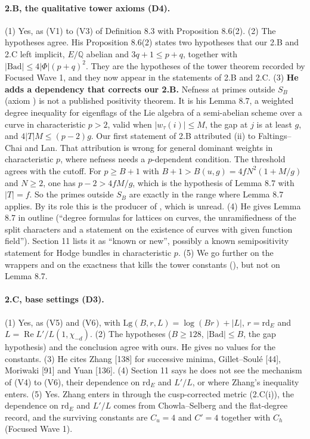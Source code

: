 \documentclass[11pt]{article}
\theoremstyle{remark}
\begin{document}
\paragraph{2.B, the qualitative tower axioms (D4).} (1) Yes, as (V1) to (V3) of Definition 8.3 with Proposition 8.6(2). (2) The hypotheses agree. His Proposition 8.6(2) states two hypotheses that our 2.B and 2.C left implicit, $E/\mathbb Q$ abelian and $3q+1\le p+q$, together with $\lvert\mathrm{Bad}\rvert\le4\lvert\Phi\rvert(p+q)^2$. They are the hypotheses of the tower theorem recorded by Focused Wave 1, and they now appear in the statements of 2.B and 2.C. (3) \textbf{He adds a dependency that corrects our 2.B.} Nefness at primes outside $S_B$ (axiom ) is not a published positivity theorem. It is his Lemma 8.7, a weighted degree inequality for eigenflags of the Lie algebra of a semi-abelian scheme over a curve in characteristic $p>2$, valid when $\lvert w_\tau(i)\rvert\le M$, the gap at $j$ is at least $g$, and $4\lvert T\rvert M\le(p-2)g$. Our first statement of 2.B attributed (ii) to Faltings--Chai and Lan. That attribution is wrong for general dominant weights in characteristic $p$, where nefness needs a $p$-dependent condition. The threshold agrees with the cutoff. For $p\ge B+1$ with $B+1>B(u,g)=4fN^2(1+M/g)$ and $N\ge2$, one has $p-2>4fM/g$, which is the hypothesis of Lemma 8.7 with $\lvert T\rvert=f$. So the primes outside $S_B$ are exactly in the range where Lemma 8.7 applies. By its role this is the producer  of , which is unread. (4) He gives Lemma 8.7 in outline (``degree formulas for lattices on curves, the unramifiedness of the split characters and a statement on the existence of curves with given function field''). Section 11 lists it as ``known or new'', possibly a known semipositivity statement for Hodge bundles in characteristic $p$. (5) We go further on the wrappers and on the exactness that kills the tower constants (), but not on Lemma 8.7.

\paragraph{2.C, base settings (D3).} (1) Yes, as (V5) and (V6), with $\mathrm{Lg}(B,r,L)=\log(Br)+\lvert L\rvert$, $r=\mathrm{rd}_E$ and $L=\operatorname{Re}L'/L(1,\chi_{-d})$. (2) The hypotheses ($B\ge128$, $\lvert\mathrm{Bad}\rvert\le B$, the gap hypothesis) and the conclusion agree with ours. He gives no values for the constants. (3) He cites Zhang [138] for successive minima, Gillet--Soulé [44], Moriwaki [91] and Yuan [136]. (4) Section 11 says he does not see the mechanism of (V4) to (V6), their dependence on $\mathrm{rd}_E$ and $L'/L$, or where Zhang's inequality enters. (5) Yes. Zhang enters in  through the cusp-corrected metric (2.C(i)), the dependence on $\mathrm{rd}_E$ and $L'/L$ comes from Chowla--Selberg and the flat-degree record, and the surviving constants are $C_u=4$ and $C'=4$ together with $C_h$ (Focused Wave 1).
\end{document}
